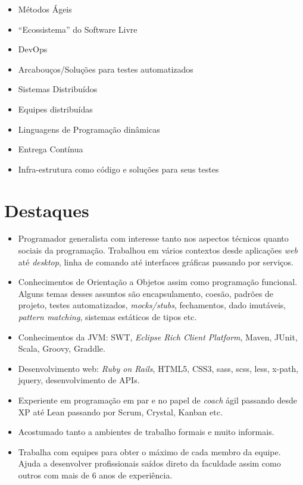 \documentclass[letter,10pt]{article}
\begin{document}
\begin{itemize}
\item Métodos Ágeis
\item ``Ecossistema'' do Software Livre
\item DevOps
\item Arcabouços/Soluções para testes automatizados
\item Sistemas Distribuídos
\item Equipes distribuídas
\item Linguagens de Programação dinâmicas
\item Entrega Contínua
\item Infra-estrutura como código e soluções para seus testes
\end{itemize}

\section{Destaques}

\begin{itemize}
\item Programador generalista com interesse tanto nos aspectos
  técnicos quanto sociais da programação. Trabalhou em vários contextos desde aplicações \textit{web} até \textit{desktop}, linha de comando até interfaces
  gráficas passando por serviços.
\item Conhecimentos de Orientação a Objetos assim como programação funcional. Alguns temas desses assuntos são encapsulamento, coesão, padrões de projeto,  testes automatizados, \textit{mocks/stubs}, fechamentos, dado imutáveis, \textit{pattern matching}, sistemas estáticos de tipos etc.
\item Conhecimentos da JVM: SWT, \textit{Eclipse Rich Client Platform}, Maven, JUnit, Scala, Groovy, Graddle.
\item Desenvolvimento web: \textit{Ruby on Rails}, HTML5, CSS3, sass, scss, less, x-path, jquery, desenvolvimento de APIs.
\item Experiente em programação em par e no papel de \textit{coach}
  ágil passando desde XP até Lean passando por Scrum, Crystal, Kanban etc.
\item Acostumado tanto a ambientes de trabalho formais e muito
  informais.
\item Trabalha com equipes para obter o máximo de cada membro da equipe. Ajuda a desenvolver profissionais saídos direto da faculdade assim como outros com mais de 6 anos de experiência.
\end{itemize}
\end{document}
